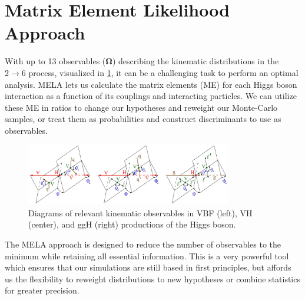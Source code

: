 \section{Matrix Element Likelihood Approach}

With up to 13 observables ($\boldsymbol{\Omega}$) describing the \Hboson kinematic distributions in the $2\to 6$ process, visualized in \ref{fig:MELA}, it can be a challenging task to perform an optimal analysis. %
MELA lets us calculate the matrix elements (ME) for each Higgs boson interaction as a function of its couplings and interacting particles. We can utilize these ME in ratios to change our hypotheses and reweight our Monte-Carlo samples, or treat them as probabilities and construct discriminants to use as observables. 

\begin{figure}[!ht]
\centering
\includegraphics[width=0.8\textwidth,clip] {figures/MELA.jpg}
\caption{Diagrams of relevant kinematic observables in VBF (left), VH (center), and ggH (right) productions of the Higgs boson.}
\label{fig:MELA}
\end{figure}

The MELA approach is designed to reduce the number of observables to the minimum while retaining all essential information. This is a very powerful tool which ensures that our simulations are still based in first principles, but affords us the flexibility to reweight distributions to new hypotheses or combine statistics for greater precision. 



